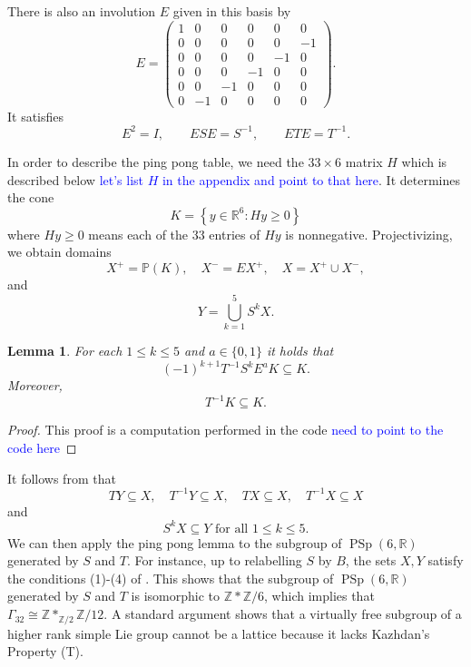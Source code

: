 \documentclass[11pt]{article}
\newtheorem{lemma}{Lemma}
\DeclareMathOperator{\PSp}{PSp}
\newcommand{\ZZ}{\mathbb{Z}}
\newcommand{\RR}{\mathbb{R}}
\newcommand{\PP}{\mathbb{P}}
\begin{document}
There is also an involution $E$ given in this basis by
\begin{equation*}
E=
\begin{pmatrix}
1&0&0&0&0&0\\
0&0&0&0&0&-1\\
0&0&0&0&-1&0\\
0&0&0&-1&0&0\\
0&0&-1&0&0&0\\
0&-1&0&0&0&0
\end{pmatrix}.
\end{equation*}
It satisfies
\begin{equation*}
  E^2=I,\qquad ESE=S^{-1},\qquad ETE=T^{-1}.
\end{equation*}

In order to describe the ping pong table, we need the $33 \times 6$ matrix $H$ which is described below \textcolor{blue}{let's list $H$ in the appendix and point to that here}.
It determines the cone 
    \[ K = \left\{ y \in \RR^6 : Hy \ge 0 \right\} \]
where $Hy \ge 0$ means each of the 33 entries of $Hy$ is nonnegative.
Projectivizing, we obtain domains
    \[ X^+ = \PP(K), \quad X^- = E X^+, \quad X = X^+ \cup X^- ,\]
and 
    \[ Y = \bigcup_{k=1}^5 S^k X .\]

\begin{lemma}\label{lem:cone containment}
    For each $1 \le k \le 5$ and $a \in \{0,1\}$ it holds that 
        \[ (-1)^{k+1} T^{-1} S^k E^a K \subseteq K .\]
    Moreover, 
        \[ T^{-1} K \subseteq K .\]
\end{lemma}

\begin{proof}
    This proof is a computation performed in the code \textcolor{blue}{need to point to the code here}
\end{proof}

It follows from  that 
    \[ T Y \subseteq X, \quad T^{-1} Y \subseteq X, \quad T X \subseteq X, \quad T^{-1} X \subseteq X \]
and 
    \[ S^k X \subseteq Y \text{ for all } 1 \le k \le 5.\] 
We can then apply the ping pong lemma to the subgroup of $\PSp(6,\RR)$ generated by $S$ and $T$.
For instance, up to relabelling $S$ by $B$, the sets $X,Y$ satisfy the conditions (1)-(4) of \cite[page 494]{BajpaiDonaNitsche2025Thin}.
This shows that the subgroup of $\PSp(6,\RR)$ generated by $S$ and $T$ is isomorphic to $\ZZ \ast \ZZ/6$, which implies that $\Gamma_{32} \cong \ZZ \ast_{\ZZ/2} \ZZ/12$.
A standard argument shows that a virtually free subgroup of a higher rank simple Lie group cannot be a lattice because it lacks Kazhdan's Property (T).
    
\end{document}

